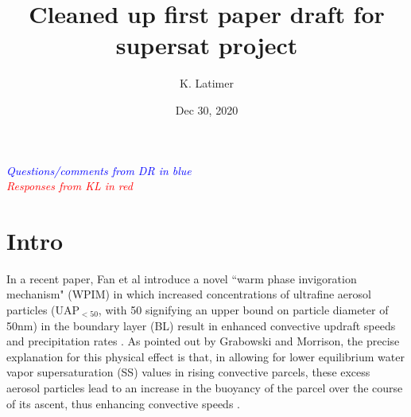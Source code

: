 \documentclass{article}
\title{Cleaned up first paper draft for supersat project}
\author{K. Latimer}
\date{Dec 30, 2020}
\newcommand{\drcomm}[1]{\textcolor{blue}{\textit{#1}}}
\newcommand{\klcomm}[1]{\textcolor{red}{\textit{#1}}}
\begin{document}
\maketitle

\noindent\drcomm{Questions/comments from DR in blue} \\
\noindent\klcomm{Responses from KL in red}\\

\section{Intro}

In a recent paper, Fan et al introduce a novel ``warm phase invigoration mechanism" (WPIM) in which increased concentrations of ultrafine aerosol particles (UAP$_{<50}$, with 50 signifying an upper bound on particle diameter of 50nm) in the boundary layer (BL) result in enhanced convective updraft speeds and precipitation rates \cite{Fan2018}. As pointed out by Grabowski and Morrison, the precise explanation for this physical effect is that, in allowing for lower equilibrium water vapor supersaturation (SS) values in rising convective parcels, these excess aerosol particles lead to an increase in the buoyancy of the parcel over the course of its ascent, thus enhancing convective speeds \cite{Grabowski2020}.
\end{document}
